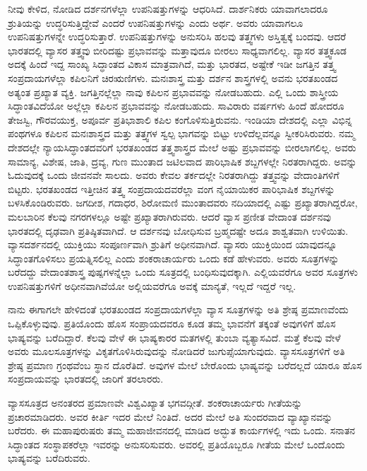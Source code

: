 ನೀವು ಕೇಳಿದ, ನೋಡಿದ ದರ್ಶನಗಳೆಲ್ಲಾ ಉಪನಿಷತ್ತುಗಳನ್ನು ಆಧರಿಸಿದೆ. ದಾರ್ಶನಿಕರು ಯಾವಾಗಲಾದರೂ ಶ್ರುತಿಯನ್ನು ಉದ್ಧರಿಸುತ್ತಿದ್ದೇವೆ ಎಂದರೆ ಉಪನಿಷತ್ತುಗಳನ್ನು ಎಂದು ಅರ್ಥ. ಅವರು ಯಾವಾಗಲೂ ಉಪನಿಷತ್ತುಗಳನ್ನೇ ಉದ್ಧರಿಸುತ್ತಾರೆ. ಉಪನಿಷತ್ತುಗಳನ್ನು ಅನುಸರಿಸಿ ಹಲವು ತತ್ತ್ವಗಳು ಅಸ್ತಿತ್ವಕ್ಕೆ ಬಂದವು. ಆದರೆ ಭಾರತದಲ್ಲಿ ವ್ಯಾಸರ ತತ್ತ್ವವು ಬೀರಿದಷ್ಟು ಪ್ರಭಾವವನ್ನು ಮತ್ತಾವುದೂ ಬೀರಲು ಸಾಧ್ಯವಾಗಲಿಲ್ಲ. ವ್ಯಾಸರ ತತ್ತ್ವಕೂಡ ಅದಕ್ಕೆ ಹಿಂದೆ ಇದ್ದ ಸಾಂಖ್ಯ ಸಿದ್ಧಾಂತದ ವಿಕಾಸ ಮಾತ್ರವಾಗಿದೆ, ಮತ್ತು ಭಾರತದ, ಅಷ್ಟೇಕೆ ಇಡೀ ಜಗತ್ತಿನ ತತ್ತ್ವ ಸಂಪ್ರದಾಯಗಳೆಲ್ಲಾ ಕಪಿಲನಿಗೆ ಚಿರಋಣಿಗಳು. ಮನಃಶಾಸ್ತ್ರ ಮತ್ತು ದರ್ಶನ ಶಾಸ್ತ್ರಗಳಲ್ಲಿ ಅವನು ಭರತಖಂಡದ ಅತ್ಯಂತ ಪ್ರಖ್ಯಾತ ವ್ಯಕ್ತಿ. ಜಗತ್ತಿನಲ್ಲೆಲ್ಲಾ ನಾವು ಕಪಿಲನ ಪ್ರಭಾವವನ್ನು ನೋಡಬಹುದು. ಎಲ್ಲಿ ಒಂದು ಶಾಸ್ತ್ರೀಯ ಸಿದ್ಧಾಂತವಿದೆಯೋ ಅಲ್ಲೆಲ್ಲಾ ಕಪಿಲನ ಪ್ರಭಾವವನ್ನು ನೋಡಬಹುದು. ಸಾವಿರಾರು ವರ್ಷಗಳು ಹಿಂದೆ ಹೋದರೂ ತೇಜಸ್ವಿ, ಗೌರವಯುಕ್ತ, ಅಪೂರ್ವ ಪ್ರತಿಭಾಶಾಲಿ ಕಪಿಲ ಕಂಗೊಳಿಸುತ್ತಿರುವನು. ಇಂಡಿಯಾ ದೇಶದಲ್ಲಿ ಎಲ್ಲಾ ವಿಭಿನ್ನ ಪಂಥಗಳೂ ಕಪಿಲನ ಮನಃಶಾಸ್ತ್ರದ ಮತ್ತು ತತ್ತ್ವಗಳ ಸ್ವಲ್ಪ ಭಾಗವನ್ನು ಬಿಟ್ಟು ಉಳಿದೆಲ್ಲವನ್ನೂ ಸ್ವೀಕರಿಸಿರುವರು. ನಮ್ಮ ದೇಶದಲ್ಲೇ ನ್ಯಾಯಸಿದ್ಧಾಂತದವರಿಗೆ ಭರತಖಂಡದ ತತ್ತ್ವಶಾಸ್ತ್ರದ ಮೇಲೆ ಅಷ್ಟು ಪ್ರಭಾವವನ್ನು ಬೀರಲಾಗಲಿಲ್ಲ. ಅವರು ಸಾಮಾನ್ಯ, ವಿಶೇಷ, ಜಾತಿ, ದ್ರವ್ಯ, ಗುಣ ಮುಂತಾದ ಜಟಿಲವಾದ ಪಾರಿಭಾಷಿಕ ಶಬ್ದಗಳಲ್ಲೇ ನಿರತರಾಗಿದ್ದರು. ಅವನ್ನು ಓದುವುದಕ್ಕೆ ಒಂದು ಜೀವನವೇ ಸಾಲದು. ಅವರು ಕೇವಲ ತರ್ಕದಲ್ಲೇ ನಿರತರಾಗಿದ್ದು ತತ್ತ್ವವನ್ನು ವೇದಾಂತಿಗಳಿಗೆ ಬಿಟ್ಟರು. ಭರತಖಂಡದ ಇತ್ತೀಚಿನ ತತ್ತ್ವ ಸಂಪ್ರದಾಯದವರೆಲ್ಲಾ ವಂಗ ನೈಯಾಯಿಕರ ಪಾರಿಭಾಷಿಕ ಶಬ್ದಗಳನ್ನು ಬಳಸಿಕೊಂಡಿರುವರು. ಜಗದೀಶ, ಗದಾಧರ, ಶಿರೋಮಣಿ ಮುಂತಾದವರು ನದಿಯಾದಲ್ಲಿ ಎಷ್ಟು ಪ್ರಖ್ಯಾತರಾಗಿದ್ದರೋ, ಮಲಬಾರಿನ ಕೆಲವು ನಗರಗಳಲ್ಲೂ ಅಷ್ಟೇ ಪ್ರಖ್ಯಾತರಾಗಿರುವರು. ಆದರೆ ವ್ಯಾಸ ಪ್ರಣೀತ ವೇದಾಂತ ದರ್ಶನವು ಭಾರತದಲ್ಲಿ ದೃಢವಾಗಿ ಪ್ರತಿಷ್ಠಿತವಾಗಿದೆ. ಆ ದರ್ಶನವು ಬೋಧಿಸುವ ಬ್ರಹ್ಮದಷ್ಟೇ ಅದೂ ಶಾಶ್ವತವಾಗಿ ಉಳಿಯಿತು. ವ್ಯಾಸದರ್ಶನದಲ್ಲಿ ಯುಕ್ತಿಯು ಸಂಪೂರ್ಣವಾಗಿ ಶ್ರುತಿಗೆ ಅಧೀನವಾಗಿದೆ. ವ್ಯಾಸರು ಯುಕ್ತಿಯಿಂದ ಯಾವುದನ್ನೂ ಸಿದ್ಧಾಂತಗೊಳಿಸಲು ಪ್ರಯತ್ನಿಸಲಿಲ್ಲ ಎಂದು ಶಂಕರಾಚಾರ್ಯರು ಒಂದು ಕಡೆ ಹೇಳುವರು. ಅವರು ಸೂತ್ರಗಳನ್ನು ಬರೆದದ್ದು ವೇದಾಂತಶಾಸ್ತ್ರ ಪುಷ್ಪಗಳನ್ನೆಲ್ಲಾ ಒಂದು ಸೂತ್ರದಲ್ಲಿ ಬಂಧಿಸುವುದಕ್ಕಾಗಿ. ಎಲ್ಲಿಯವರೆಗೂ ಅವರ ಸೂತ್ರಗಳು ಉಪನಿಷತ್ತುಗಳಿಗೆ ಅಧೀನವಾಗಿವೆಯೋ ಅಲ್ಲಿಯವರೆಗೂ ಅವಕ್ಕೆ ಮಾನ್ಯತೆ, ಇಲ್ಲದೆ ಇದ್ದರೆ ಇಲ್ಲ.

ನಾನು ಈಗಾಗಲೇ ಹೇಳಿದಂತೆ ಭರತಖಂಡದ ಸಂಪ್ರದಾಯಗಳೆಲ್ಲಾ ವ್ಯಾಸ ಸೂತ್ರಗಳನ್ನು ಅತಿ ಶ್ರೇಷ್ಠ ಪ್ರಮಾಣವೆಂದು ಒಪ್ಪಿಕೊಳ್ಳುವುವು. ಪ್ರತಿಯೊಂದು ಹೊಸ ಸಂಪ್ರಾಯದವರೂ ಕೂಡ ತಮ್ಮ ಭಾವನೆಗೆ ತಕ್ಕಂತೆ ಅವುಗಳಿಗೆ ಹೊಸ ಭಾಷ್ಯವನ್ನು ಬರೆದಿದ್ದಾರೆ. ಕೆಲವು ವೇಳೆ ಈ ಭಾಷ್ಯಕಾರರ ಮತಗಳಲ್ಲಿ ತುಂಬಾ ವ್ಯತ್ಯಾಸವಿದೆ. ಮತ್ತೆ ಕೆಲವು ವೇಳೆ ಅವರು ಮೂಲಸೂತ್ರಗಳನ್ನು ವಿಕೃತಗೊಳಿಸಿರುವುದನ್ನು ನೋಡಿದರೆ ಜುಗುಪ್ಸೆಯಾಗುವುದು. ವ್ಯಾಸಸೂತ್ರಗಳಿಗೆ ಅತಿ ಶ್ರೇಷ್ಠ ಪ್ರಮಾಣ ಗ್ರಂಥವೆಂಬ ಸ್ಥಾನ ದೊರೆತಿದೆ. ಅವುಗಳ ಮೇಲೆ ಬೇರೊಂದು ಭಾಷ್ಯವನ್ನು ಬರೆದಲ್ಲದೆ ಯಾರೂ ಹೊಸ ಸಂಪ್ರದಾಯವನ್ನು ಭಾರತದಲ್ಲಿ ಜಾರಿಗೆ ತರಲಾರರು.

ವ್ಯಾಸಸೂತ್ರದ ಅನಂತರದ ಪ್ರಮಾಣವೇ ವಿಶ್ವವಿಖ್ಯಾತ ಭಗವದ್ಗೀತೆ. ಶಂಕರಾ\break ಚಾರ್ಯರು ಗೀತೆಯನ್ನು ಪ್ರಚಾರಮಾಡಿದರು. ಅವರ ಕೀರ್ತಿ ಇದರ ಮೇಲೆ ನಿಂತಿದೆ. ಅದರ ಮೇಲೆ ಅತಿ ಸುಂದರವಾದ ವ್ಯಾಖ್ಯಾನವನ್ನು ಬರೆದರು. ಈ ಮಹಾಪುರುಷರು ತಮ್ಮ ಮಹಾಜೀವನದಲ್ಲಿ ಮಾಡಿದ ಅದ್ಭುತ ಕಾರ್ಯಗಳಲ್ಲಿ ಇದು ಒಂದು. ಸನಾತನ ಸಿದ್ಧಾಂತದ ಸಂಸ್ಥಾಪಕರೆಲ್ಲಾ ಇವರನ್ನು ಅನುಸರಿಸುವರು. ಅವರಲ್ಲಿ ಪ್ರತಿಯೊಬ್ಬರೂ ಗೀತೆಯ ಮೇಲೆ ಒಂದೊಂದು ಭಾಷ್ಯವನ್ನು ಬರೆದಿರುವರು.

